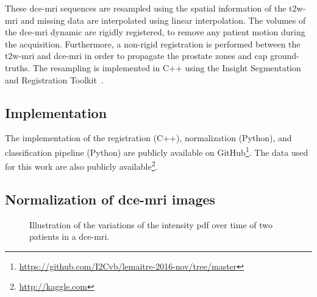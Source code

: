 These \ac{dce}-\ac{mri} sequences are resampled using the spatial information of the \ac{t2w}-\ac{mri} and missing data are interpolated using linear interpolation.
The volumes of the \ac{dce}-\ac{mri} dynamic are rigidly registered, to remove any patient motion during the acquisition.
Furthermore, a non-rigid registration is performed between the \ac{t2w}-\ac{mri} and \ac{dce}-\ac{mri} in order to propagate the prostate zones and \ac{cap} ground-truths.
The resampling is implemented in C++ using the Insight Segmentation and Registration Toolkit~\citep{ibanez2005itk}.

\subsection{Implementation}

The implementation of the registration (C++), normalization (Python), and classification pipeline (Python) are publicly available on GitHub\footnote{\url{https://github.com/I2Cvb/lemaitre-2016-nov/tree/master}}.
The data used for this work are also publicly available\footnote{\url{http://kaggle.com}}.

\subsection{Normalization of \ac{dce}-\ac{mri} images}\label{sec:norm}

\begin{figure}
  \centering
  \hspace*{\fill}
   \hfill
  \hspace*{\fill}
  \caption{Illustration of the variations of the intensity \acs*{pdf} over time of two patients in a \ac{dce}-\ac{mri}.}
  \label{fig:heatmap}
\end{figure}

